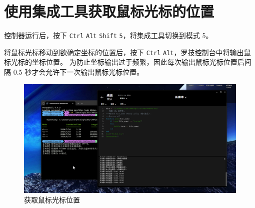 \section{使用集成工具获取鼠标光标的位置}

控制器运行后，按下 \lstinline{Ctrl} \lstinline{Alt} \lstinline{Shift} \lstinline{5}，将集成工具切换到模式 5。

将鼠标光标移动到欲确定坐标的位置后，按下 \lstinline{Ctrl} \lstinline{Alt}，罗技控制台中将输出鼠标光标的坐标位置。
为防止坐标输出过于频繁，因此每次输出鼠标光标位置后间隔 0.5 秒才会允许下一次输出鼠标光标位置。

\begin{figure}[H]
    \Centering
    \includegraphics[width=\textwidth]{docs/assets/position.png}
    \caption{获取鼠标光标位置}
\end{figure}